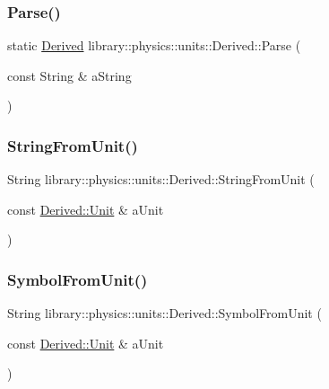 \subsubsection{\texorpdfstring{Parse()}{Parse()}}
{\footnotesize\ttfamily static \hyperlink{classlibrary_1_1physics_1_1units_1_1_derived}{Derived} library\+::physics\+::units\+::\+Derived\+::\+Parse (\begin{DoxyParamCaption}\item[{const String \&}]{a\+String }\end{DoxyParamCaption})\hspace{0.3cm}{\ttfamily [static]}}

\mbox{\label{classlibrary_1_1physics_1_1units_1_1_derived_aca817ec7752af10f66c14f94467cf546}} 
\subsubsection{\texorpdfstring{String\+From\+Unit()}{StringFromUnit()}}
{\footnotesize\ttfamily String library\+::physics\+::units\+::\+Derived\+::\+String\+From\+Unit (\begin{DoxyParamCaption}\item[{const \hyperlink{classlibrary_1_1physics_1_1units_1_1_derived_1_1_unit}{Derived\+::\+Unit} \&}]{a\+Unit }\end{DoxyParamCaption})\hspace{0.3cm}{\ttfamily [static]}}

\mbox{\label{classlibrary_1_1physics_1_1units_1_1_derived_a4c11c10b784fbb12cdae01125091a386}} 
\subsubsection{\texorpdfstring{Symbol\+From\+Unit()}{SymbolFromUnit()}}
{\footnotesize\ttfamily String library\+::physics\+::units\+::\+Derived\+::\+Symbol\+From\+Unit (\begin{DoxyParamCaption}\item[{const \hyperlink{classlibrary_1_1physics_1_1units_1_1_derived_1_1_unit}{Derived\+::\+Unit} \&}]{a\+Unit }\end{DoxyParamCaption})\hspace{0.3cm}{\ttfamily [static]}}

